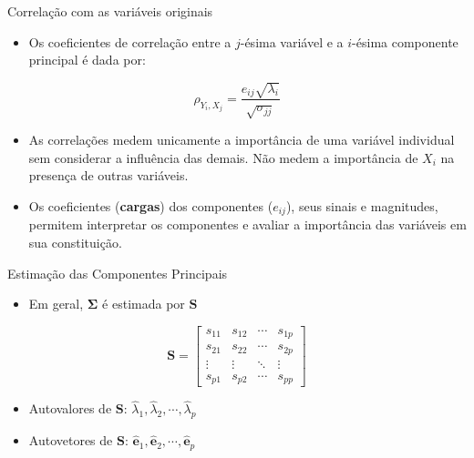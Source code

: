 \documentclass[
  ignorenonframetext,
  aspectratio=169,
]{beamer}
\providecommand{\tightlist}{%
  \setlength{\itemsep}{0pt}\setlength{\parskip}{0pt}}
\begin{document}
\begin{frame}{Correlação com as variáveis originais}
\label{correlauxe7uxe3o-com-as-variuxe1veis-originais}
\begin{itemize}
\tightlist
\item
  Os coeficientes de correlação entre a \(j\)-ésima variável e a
  \(i\)-ésima componente principal é dada por:
\end{itemize}

\[\rho_{Y_i,X_j} = \displaystyle{\frac{e_{ij} \sqrt{\lambda_i}}{\sqrt{\sigma_{jj}}}}\]

\pause

\begin{itemize}
\tightlist
\item
  As correlações medem unicamente a importância de uma variável
  individual sem considerar a influência das demais. Não medem a
  importância de \(X_i\) na presença de outras variáveis.
\end{itemize}

\pause

\begin{itemize}
\tightlist
\item
  Os coeficientes (\textbf{cargas}) dos componentes (\(e_{ij}\)), seus
  sinais e magnitudes, permitem interpretar os componentes e avaliar a
  importância das variáveis em sua constituição.
\end{itemize}
\end{frame}

\begin{frame}{Estimação das Componentes Principais}
\label{estimauxe7uxe3o-das-componentes-principais}
\begin{itemize}
\tightlist
\item
  Em geral, \(\boldsymbol{\Sigma}\) é estimada por \(\boldsymbol{S}\)
\end{itemize}

\[\boldsymbol{S} = \left[ \begin{array}{cccc} s_{11} & s_{12} & \cdots & s_{1p}
\\ s_{21} & s_{22} & \cdots & s_{2p} 
\\ \vdots & \vdots & \ddots & \vdots
\\ s_{p1} & s_{p2} & \cdots & s_{pp} \end{array} \right]\]

\pause

\begin{itemize}
\tightlist
\item
  Autovalores de \(\boldsymbol{S}\):
  \(\hat{\lambda}_1, \hat{\lambda}_2, \cdots, \hat{\lambda}_p\)
\end{itemize}

\pause

\begin{itemize}
\tightlist
\item
  Autovetores de \(\boldsymbol{S}\):
  \(\hat{\boldsymbol{e}}_1, \hat{\boldsymbol{e}}_2, \cdots, \hat{\boldsymbol{e}}_p\)
\end{itemize}
\end{frame}
\end{document}
